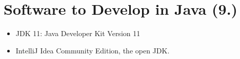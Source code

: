 \section{Software to Develop in Java (9.)}
\begin{itemize}
    \item JDK 11: Java Developer Kit Version 11
    \item IntelliJ Idea Community Edition, the open JDK.
\end{itemize}
